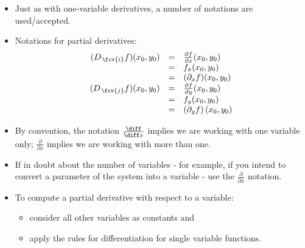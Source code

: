 \begin{frame}
\begin{itemize}
\item Just as with one-variable derivatives, a number of notations are used/accepted.
\item Notations for partial derivatives:
\[
\begin{array}{rcl}
(D_{\,\fcv{i}}f)(x_0,y_0) &=& \frac{\partial f}{\partial x}(x_0,y_0) \\
&=&
f_x(x_0,y_0)\\
&=&(\partial_x f)(x_0, y_0)\\
(D_{\,\fcv{j}}f)(x_0,y_0) &=&  \frac{\partial f}{\partial y}(x_0,y_0) \\
&=& f_y(x_0,y_0)\\
&=&\left(\partial_y f\right) (x_0, y_0)
\end{array}
\]
\item<2-> By convention, the notation $\frac{\diff }{\diff x}$ implies we are working with one variable only; $\frac{\partial }{\partial x}$ implies we are working with more than one. 
\item<3-> If in doubt about the number of variables - for example, if you intend to convert a parameter of the system into a variable - use the $\frac{\partial}{\partial x}$ notation. 
\item<4-> To compute a partial derivative with respect to a variable:
\begin{itemize}
\item consider all other variables as constants and
\item apply the rules for differentiation for single variable functions.
\end{itemize}
\end{itemize}
\end{frame}